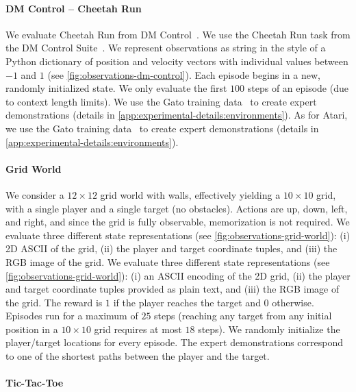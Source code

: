 \paragraph{DM Control -- Cheetah Run}

\ificlr
We evaluate Cheetah Run from DM Control~\citep{tassa2018deepmind}.
\else
We use the Cheetah Run task from the DM Control Suite~\citep{tassa2018deepmind}.
\fi
We represent observations as string in the style of a Python dictionary of position and velocity vectors with individual values between $-1$ and $1$ (see \cref{fig:observations-dm-control}).
Each episode begins in a new, randomly initialized state.
We only evaluate the first $100$ steps of an episode (due to context length limits).
\ificlr
We use the Gato training data~\citep{reed2022generalist} to create expert demonstrations (details in \cref{app:experimental-details:environments}).
\else
As for Atari, we use the Gato training data~\citep{reed2022generalist} to create expert demonstrations (details in \cref{app:experimental-details:environments}).
\fi

\paragraph{Grid World}

We consider a $12\times12$ grid world with walls, effectively yielding a $10\times10$ grid, with a single player and a single target (no obstacles).
Actions are up, down, left, and right, and since the grid is fully observable, memorization is not required.
\ificlr
We evaluate three different state representations (see \cref{fig:observations-grid-world}): (i) 2D ASCII of the grid, (ii) the player and target coordinate tuples, and (iii) the RGB image of the grid.
\else
We evaluate three different state representations (see \cref{fig:observations-grid-world}): (i) an ASCII encoding of the 2D grid, (ii) the player and target coordinate tuples provided as plain text, and (iii) the RGB image of the grid.
\fi
The reward is $1$ if the player reaches the target and $0$ otherwise.
Episodes run for a maximum of $25$ steps (reaching any target from any initial position in a $10\times10$ grid requires at most $18$ steps).
We randomly initialize the player/target locations for every episode.
The expert demonstrations correspond to one of the shortest paths between the player and the target.

\paragraph{Tic-Tac-Toe}

